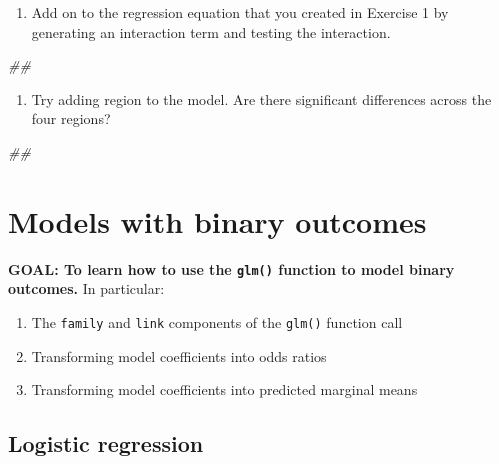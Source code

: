 \documentclass[
]{book}
\newenvironment{Shaded}{\begin{snugshade}}{\end{snugshade}}
\newcommand{\CommentTok}[1]{\textcolor[rgb]{0.56,0.35,0.01}{\textit{#1}}}
\providecommand{\tightlist}{%
  \setlength{\itemsep}{0pt}\setlength{\parskip}{0pt}}
\begin{document}
\begin{enumerate}
\def\labelenumi{\arabic{enumi}.}
\tightlist
\item
  Add on to the regression equation that you created in Exercise 1 by generating an interaction term and testing the interaction.
\end{enumerate}

\begin{Shaded}
\begin{Highlighting}[]
\CommentTok{## }
\end{Highlighting}
\end{Shaded}

\begin{enumerate}
\def\labelenumi{\arabic{enumi}.}
\setcounter{enumi}{1}
\tightlist
\item
  Try adding region to the model. Are there significant differences across the four regions?
\end{enumerate}

\begin{Shaded}
\begin{Highlighting}[]
\CommentTok{## }
\end{Highlighting}
\end{Shaded}

\hypertarget{models-with-binary-outcomes}{%
\section{Models with binary outcomes}\label{models-with-binary-outcomes}}

\textbf{GOAL: To learn how to use the \texttt{glm()} function to model binary outcomes.} In particular:

\begin{enumerate}
\def\labelenumi{\arabic{enumi}.}
\tightlist
\item
  The \texttt{family} and \texttt{link} components of the \texttt{glm()} function call
\item
  Transforming model coefficients into odds ratios
\item
  Transforming model coefficients into predicted marginal means
\end{enumerate}

\hypertarget{logistic-regression}{%
\subsection{Logistic regression}\label{logistic-regression}}
\end{document}

